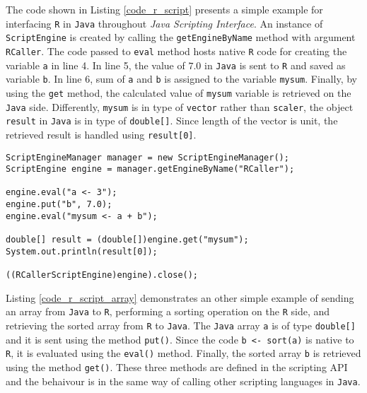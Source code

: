 \documentclass[10pt,a4paper, final, oneside]{article}
\begin{document}
The code shown in Listing \ref{code_r_script} presents a simple example for interfacing \texttt{R} in \texttt{Java} throughout \emph{Java Scripting Interface}. An instance of \texttt{ScriptEngine} is created by calling the \texttt{getEngineByName} method with argument \texttt{RCaller}. The code passed to \texttt{eval} method hosts native \texttt{R} code for creating the variable \texttt{a} in line 4. In line 5, the value of $7.0$ in \texttt{Java} is sent to \texttt{R} and saved as variable \texttt{b}. In line 6, sum of \texttt{a} and  \texttt{b} is assigned to the variable \texttt{mysum}. Finally, by using the \texttt{get} method, the calculated value of \texttt{mysum} variable is retrieved on the \texttt{Java} side. Differently, \texttt{mysum} is in type of \texttt{vector} rather than \texttt{scaler}, the object \texttt{result} in \texttt{Java} is in type of \texttt{double[]}. Since length of the vector is unit, the retrieved result is handled using \texttt{result[0]}.

\begin{minipage}{\linewidth}
\begin{lstlisting}[caption=Calling R,label=code_r_script]
ScriptEngineManager manager = new ScriptEngineManager();
ScriptEngine engine = manager.getEngineByName("RCaller");
        
engine.eval("a <- 3");
engine.put("b", 7.0);
engine.eval("mysum <- a + b");
        
double[] result = (double[])engine.get("mysum");
System.out.println(result[0]);
        
((RCallerScriptEngine)engine).close();
\end{lstlisting}
\end{minipage}

Listing \ref{code_r_script_array} demonstrates an other simple example of sending an array from \texttt{Java} to \texttt{R}, performing a sorting operation on the \texttt{R} side, and retrieving the sorted array from \texttt{R} to \texttt{Java}. The \texttt{Java} array \texttt{a} is of type \texttt{double[]} and it is sent using the method \texttt{put()}. Since the code \texttt{b <- sort(a)} is native to \texttt{R}, it is evaluated using the \texttt{eval()} method. Finally, the sorted array \texttt{b} is retrieved using the method \texttt{get()}. These three methods are defined in the scripting API and the behaivour is in the same way of calling other scripting languages in \texttt{Java}. 
\end{document}
